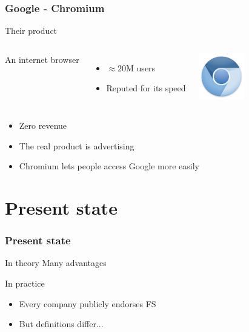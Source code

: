 \documentclass{beamer}
\begin{document}
\begin{frame}

  \frametitle{Google - Chromium}

  \begin{block}{Their product}
    \begin{columns}[c]

      An internet browser
      \begin{itemize}
        \item{$\approx 20$M users}
        \item{Reputed for its speed}
      \end{itemize}

      \includegraphics[width=2cm]{logo_chromium.png}

    \end{columns}
  \end{block}

  \vfill

  \begin{itemize}
    \item<2->{Zero revenue}
    \item<3->{The real product is advertising}
    \item<4>{Chromium lets people access Google more easily}
  \end{itemize}

\end{frame}

\section{Present state}

\begin{frame}

  \frametitle{Present state}

  \begin{block}{In theory}
    Many advantages
  \end{block}

  \vfill

  \begin{block}{In practice}
    \begin{itemize}
      \item<2->{Every company publicly endorses FS}
      \item<3->{But definitions differ...}
    \end{itemize}
  \end{block}

\end{frame}
\end{document}
